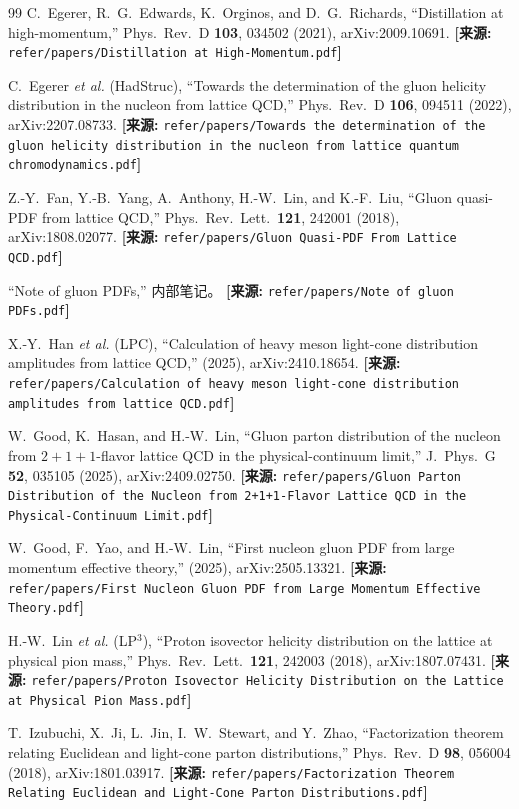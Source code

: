 \documentclass[12pt,a4paper]{ctexart}
\theoremstyle{definition}
\begin{document}
\begin{thebibliography}{99}
C.~Egerer, R.~G.~Edwards, K.~Orginos, and D.~G.~Richards,
``Distillation at high-momentum,''
Phys.\ Rev.\ D \textbf{103}, 034502 (2021), arXiv:2009.10691.
\quad\textbf{[来源:} \texttt{refer/papers/Distillation at High-Momentum.pdf}\textbf{]}

C.~Egerer \textit{et al.} (HadStruc),
``Towards the determination of the gluon helicity distribution in the nucleon from lattice QCD,''
Phys.\ Rev.\ D \textbf{106}, 094511 (2022), arXiv:2207.08733.
\quad\textbf{[来源:} \texttt{refer/papers/Towards the determination of the gluon helicity distribution in the nucleon from lattice quantum chromodynamics.pdf}\textbf{]}

Z.-Y.~Fan, Y.-B.~Yang, A.~Anthony, H.-W.~Lin, and K.-F.~Liu,
``Gluon quasi-PDF from lattice QCD,''
Phys.\ Rev.\ Lett.\ \textbf{121}, 242001 (2018), arXiv:1808.02077.
\quad\textbf{[来源:} \texttt{refer/papers/Gluon Quasi-PDF From Lattice QCD.pdf}\textbf{]}

``Note of gluon PDFs,'' 内部笔记。
\quad\textbf{[来源:} \texttt{refer/papers/Note of gluon PDFs.pdf}\textbf{]}

X.-Y.~Han \textit{et al.} (LPC),
``Calculation of heavy meson light-cone distribution amplitudes from lattice QCD,''
(2025), arXiv:2410.18654.
\quad\textbf{[来源:} \texttt{refer/papers/Calculation of heavy meson light-cone distribution amplitudes from lattice QCD.pdf}\textbf{]}

W.~Good, K.~Hasan, and H.-W.~Lin,
``Gluon parton distribution of the nucleon from $2+1+1$-flavor lattice QCD in the physical-continuum limit,''
J.\ Phys.\ G \textbf{52}, 035105 (2025), arXiv:2409.02750.
\quad\textbf{[来源:} \texttt{refer/papers/Gluon Parton Distribution of the Nucleon from 2+1+1-Flavor Lattice QCD in the Physical-Continuum Limit.pdf}\textbf{]}

W.~Good, F.~Yao, and H.-W.~Lin,
``First nucleon gluon PDF from large momentum effective theory,''
(2025), arXiv:2505.13321.
\quad\textbf{[来源:} \texttt{refer/papers/First Nucleon Gluon PDF from Large Momentum Effective Theory.pdf}\textbf{]}

H.-W.~Lin \textit{et al.} (LP$^3$),
``Proton isovector helicity distribution on the lattice at physical pion mass,''
Phys.\ Rev.\ Lett.\ \textbf{121}, 242003 (2018), arXiv:1807.07431.
\quad\textbf{[来源:} \texttt{refer/papers/Proton Isovector Helicity Distribution on the Lattice at Physical Pion Mass.pdf}\textbf{]}

T.~Izubuchi, X.~Ji, L.~Jin, I.~W.~Stewart, and Y.~Zhao,
``Factorization theorem relating Euclidean and light-cone parton distributions,''
Phys.\ Rev.\ D \textbf{98}, 056004 (2018), arXiv:1801.03917.
\quad\textbf{[来源:} \texttt{refer/papers/Factorization Theorem Relating Euclidean and Light-Cone Parton Distributions.pdf}\textbf{]}

\end{thebibliography}
\end{document}
